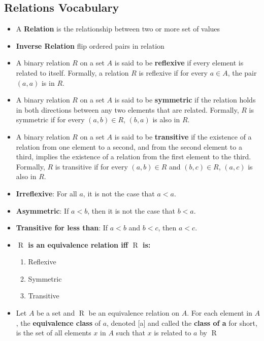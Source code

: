 \documentclass{report}
\begin{document}
      \pagebreak \bigbreak \noindent 
      \subsection{Relations Vocabulary}
      \bigbreak \noindent 
      \begin{itemize}
        \item A \textbf{Relation} is the relationship between two or more set of values
        \item \textbf{Inverse Relation} flip ordered pairs in relation
        \item A binary relation \( R \) on a set \( A \) is said to be \textbf{reflexive} if every element is related to itself. Formally, a relation \( R \) is reflexive if for every \( a \in A \), the pair \( (a, a) \) is in \( R \).
        \item A binary relation \( R \) on a set \( A \) is said to be \textbf{symmetric} if the relation holds in both directions between any two elements that are related. Formally, \( R \) is symmetric if for every \( (a, b) \in R \), \( (b, a) \) is also in \( R \).
        \item A binary relation \( R \) on a set \( A \) is said to be \textbf{transitive} if the existence of a relation from one element to a second, and from the second element to a third, implies the existence of a relation from the first element to the third. Formally, \( R \) is transitive if for every \( (a, b) \in R \) and \( (b, c) \in R \), \( (a, c) \) is also in \( R \).
        \item \textbf{Irreflexive}: For all \(a\), it is not the case that \(a < a\).
        \item \textbf{Asymmetric}: If \(a < b\), then it is not the case that \(b < a\).
        \item \textbf{Transitive for less than}: If \(a < b\) and \(b < c\), then \(a < c\).
        \item \textbf{$\mathrel{R}$ is an \textbf{equivalence} relation iff $\mathrel{R}$ is:}  
        \begin{enumerate}
            \item Reflexive
            \item Symmetric
            \item Transitive
        \end{enumerate}
      \item Let $A$ be a set and $\mathrel{R}$ be an equivalence relation on $A$. For each element in $A$, the \textbf{equivalence class} of $a$, denoted [a] and called the \textbf{class of a} for short, is the set of all elements $x$ in $A$ such that $x$ is related to $a$ by $\mathrel{R}$
      \end{itemize}
\end{document}
